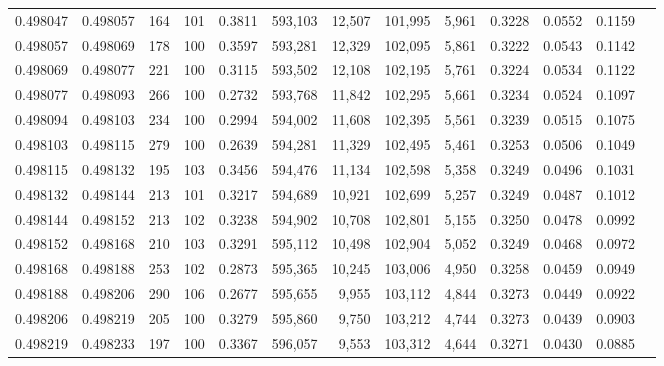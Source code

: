 \begin{tabular}{rrrrrrrrrrrrr}
0.498047 & 0.498057 &   164 & 101 &                                     0.3811 & 593,103 &  12,507 & 101,995 &   5,961 & 0.3228 & 0.0552 & 0.1159 \\
0.498057 & 0.498069 &   178 & 100 &                                     0.3597 & 593,281 &  12,329 & 102,095 &   5,861 & 0.3222 & 0.0543 & 0.1142 \\
0.498069 & 0.498077 &   221 & 100 &                                     0.3115 & 593,502 &  12,108 & 102,195 &   5,761 & 0.3224 & 0.0534 & 0.1122 \\
0.498077 & 0.498093 &   266 & 100 &                                     0.2732 & 593,768 &  11,842 & 102,295 &   5,661 & 0.3234 & 0.0524 & 0.1097 \\
0.498094 & 0.498103 &   234 & 100 &                                     0.2994 & 594,002 &  11,608 & 102,395 &   5,561 & 0.3239 & 0.0515 & 0.1075 \\
0.498103 & 0.498115 &   279 & 100 &                                     0.2639 & 594,281 &  11,329 & 102,495 &   5,461 & 0.3253 & 0.0506 & 0.1049 \\
0.498115 & 0.498132 &   195 & 103 &                                     0.3456 & 594,476 &  11,134 & 102,598 &   5,358 & 0.3249 & 0.0496 & 0.1031 \\
0.498132 & 0.498144 &   213 & 101 &                                     0.3217 & 594,689 &  10,921 & 102,699 &   5,257 & 0.3249 & 0.0487 & 0.1012 \\
0.498144 & 0.498152 &   213 & 102 &                                     0.3238 & 594,902 &  10,708 & 102,801 &   5,155 & 0.3250 & 0.0478 & 0.0992 \\
0.498152 & 0.498168 &   210 & 103 &                                     0.3291 & 595,112 &  10,498 & 102,904 &   5,052 & 0.3249 & 0.0468 & 0.0972 \\
0.498168 & 0.498188 &   253 & 102 &                                     0.2873 & 595,365 &  10,245 & 103,006 &   4,950 & 0.3258 & 0.0459 & 0.0949 \\
0.498188 & 0.498206 &   290 & 106 &                                     0.2677 & 595,655 &   9,955 & 103,112 &   4,844 & 0.3273 & 0.0449 & 0.0922 \\
0.498206 & 0.498219 &   205 & 100 &                                     0.3279 & 595,860 &   9,750 & 103,212 &   4,744 & 0.3273 & 0.0439 & 0.0903 \\
0.498219 & 0.498233 &   197 & 100 &                                     0.3367 & 596,057 &   9,553 & 103,312 &   4,644 & 0.3271 & 0.0430 & 0.0885 \\

\end{tabular}
